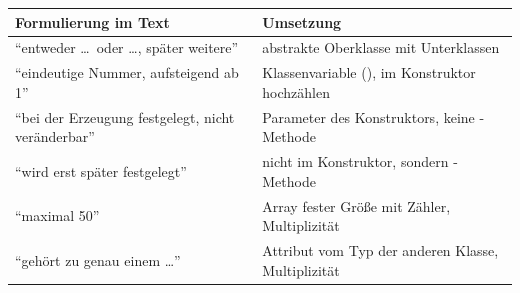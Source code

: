 \begin{center}
\begin{tabular}{@{}L{6.6cm}L{8.2cm}@{}}
\toprule
\textbf{Formulierung im Text} & \textbf{Umsetzung} \\
\midrule
\enquote{entweder \ldots\ oder \ldots, später weitere} & abstrakte Oberklasse mit Unterklassen \\
\enquote{eindeutige Nummer, aufsteigend ab 1} & Klassenvariable (), im Konstruktor hochzählen \\
\enquote{bei der Erzeugung festgelegt, nicht veränderbar} & Parameter des Konstruktors, keine -Methode \\
\enquote{wird erst später festgelegt} & nicht im Konstruktor, sondern -Methode \\
\enquote{maximal 50} & Array fester Größe mit Zähler, Multiplizität  \\
\enquote{gehört zu genau einem \ldots} & Attribut vom Typ der anderen Klasse, Multiplizität  \\
\bottomrule
\end{tabular}
\end{center}


